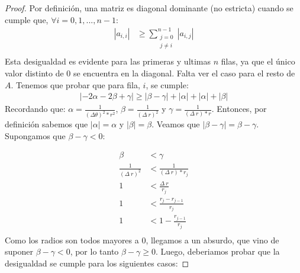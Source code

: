  \begin{proof}
    Por definición, una matriz es diagonal dominante (no estricta) cuando se cumple que, $\forall i = 0,1,...,n-1$:
    \begin{equation*}
        \begin{aligned}
          |a_{i,i}| &\geq \sum\limits_{\substack{j=0  \\ j \neq i}}^{n-1} |a_{i,j}| \\
        \end{aligned}
    \end{equation*}
    Esta desigualdad es evidente para las primeras  y ultimas $n$ filas, ya que el único valor distinto de 0 se encuentra en la diagonal.
    Falta ver el caso para el resto de $A$. Tenemos que probar que para fila, $i$, se cumple:
    \begin{equation*}
        \begin{aligned}
          |-2\alpha-2\beta+\gamma| \geq |\beta - \gamma| + |\alpha| + |\alpha| + |\beta|
        \end{aligned}
    \end{equation*}
    \newline
    Recordando que: $\alpha = \frac{1}{(\Delta\theta)^2 * r^2}$, $\beta = \frac{1}{(\Delta\ r)^2}$ y $\gamma = \frac{1}{(\Delta\ r) * r}$.
    \newline
    \newline
    Entonces, por definición sabemos que $|\alpha| = \alpha$ y $|\beta| = \beta$.
    \newline
    \newline
    Veamos que $|\beta - \gamma| = \beta - \gamma$. Supongamos que $\beta - \gamma < 0$:

    \begin{equation*}
        \begin{aligned}
          \beta &< \gamma \\
          \frac{1}{(\Delta\ r)^2}  &< \frac{1}{(\Delta\ r) * r_{j}} \\
          1 &< \frac{\Delta\ r}{r_{j}} \\
          1 &< \frac{r_{j} - r_{j-1}}{r_{j}} \\
          1 &< 1 - \frac{r_{j-1}}{r_{j}} \\
        \end{aligned}
    \end{equation*}
    Como los radios son todos mayores a 0, llegamos a un absurdo, que vino de suponer $\beta - \gamma < 0$, por lo tanto $\beta - \gamma \geq 0$.
    \newline
    \newline
    Luego, deberiamos probar que la desigualdad se cumple para los siguientes casos:


\end{proof}
